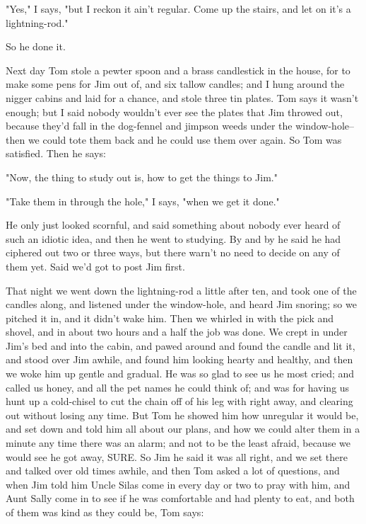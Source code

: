 "Yes," I says, "but I reckon it ain't regular.  Come up the stairs, and
let on it's a lightning-rod."

So he done it.

Next day Tom stole a pewter spoon and a brass candlestick in the house,
for to make some pens for Jim out of, and six tallow candles; and I hung
around the nigger cabins and laid for a chance, and stole three tin
plates.  Tom says it wasn't enough; but I said nobody wouldn't ever see
the plates that Jim throwed out, because they'd fall in the dog-fennel
and jimpson weeds under the window-hole--then we could tote them back and
he could use them over again.  So Tom was satisfied.  Then he says:

"Now, the thing to study out is, how to get the things to Jim."

"Take them in through the hole," I says, "when we get it done."

He only just looked scornful, and said something about nobody ever heard
of such an idiotic idea, and then he went to studying.  By and by he said
he had ciphered out two or three ways, but there warn't no need to decide
on any of them yet.  Said we'd got to post Jim first.

That night we went down the lightning-rod a little after ten, and took
one of the candles along, and listened under the window-hole, and heard
Jim snoring; so we pitched it in, and it didn't wake him.  Then we
whirled in with the pick and shovel, and in about two hours and a half
the job was done.  We crept in under Jim's bed and into the cabin, and
pawed around and found the candle and lit it, and stood over Jim awhile,
and found him looking hearty and healthy, and then we woke him up gentle
and gradual.  He was so glad to see us he most cried; and called us
honey, and all the pet names he could think of; and was for having us
hunt up a cold-chisel to cut the chain off of his leg with right away,
and clearing out without losing any time.  But Tom he showed him how
unregular it would be, and set down and told him all about our plans, and
how we could alter them in a minute any time there was an alarm; and not
to be the least afraid, because we would see he got away, SURE.  So Jim
he said it was all right, and we set there and talked over old times
awhile, and then Tom asked a lot of questions, and when Jim told him
Uncle Silas come in every day or two to pray with him, and Aunt Sally
come in to see if he was comfortable and had plenty to eat, and both of
them was kind as they could be, Tom says:

